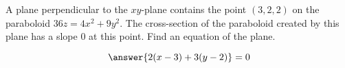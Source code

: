 \documentclass{ximera}
\author{David Guichard \and Neal Koblitz \and H. Jerome Keisler \and Albert Scheller \and Barry Balof \and Mike Wills \and Matthew Carr}
\begin{document}
\begin{exercise}




A plane perpendicular to the $xy$-plane contains the point $(3,2,2)$ on the paraboloid $36z=4x^2+9y^2$. The cross-section of the paraboloid created by this plane has a slope $0$ at this point. Find an equation of the plane.

\begin{prompt}
\[
\answer{2(x-3)+3(y-2)}=0
\]
\end{prompt}


\end{exercise}
\end{document}
